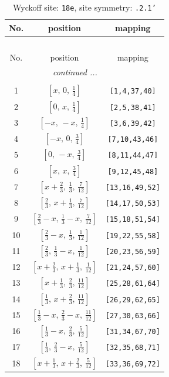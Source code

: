 \documentclass[fleqn,8pt]{jsarticle}
\begin{document}
\renewcommand{\arraystretch}{1.2}
\begin{longtable}{ccc}
\caption{Wyckoff site: {\tt 18e}, site symmetry: {\tt .2.1'}}
 \\
 \hline \hline
No. & position & mapping \\ \hline \endfirsthead

\multicolumn{2}{l}{\tablename\ \thetable{}} \\
 \hline \hline
No. & position & mapping \\ \hline \endhead

 \hline \hline
\multicolumn{2}{r}{\footnotesize\it continued ...} \\ \endfoot

 \hline \hline
\multicolumn{2}{r}{} \\ \endlastfoot

1 & $\left[ x,\, 0,\, \frac{1}{4} \right]$ & {\tt [1,4,37,40]} \\ \hline
2 & $\left[ 0,\, x,\, \frac{1}{4} \right]$ & {\tt [2,5,38,41]} \\ \hline
3 & $\left[ - x,\, - x,\, \frac{1}{4} \right]$ & {\tt [3,6,39,42]} \\ \hline
4 & $\left[ - x,\, 0,\, \frac{3}{4} \right]$ & {\tt [7,10,43,46]} \\ \hline
5 & $\left[ 0,\, - x,\, \frac{3}{4} \right]$ & {\tt [8,11,44,47]} \\ \hline
6 & $\left[ x,\, x,\, \frac{3}{4} \right]$ & {\tt [9,12,45,48]} \\ \hline
7 & $\left[ x + \frac{2}{3},\, \frac{1}{3},\, \frac{7}{12} \right]$ & {\tt [13,16,49,52]} \\ \hline
8 & $\left[ \frac{2}{3},\, x + \frac{1}{3},\, \frac{7}{12} \right]$ & {\tt [14,17,50,53]} \\ \hline
9 & $\left[ \frac{2}{3} - x,\, \frac{1}{3} - x,\, \frac{7}{12} \right]$ & {\tt [15,18,51,54]} \\ \hline
10 & $\left[ \frac{2}{3} - x,\, \frac{1}{3},\, \frac{1}{12} \right]$ & {\tt [19,22,55,58]} \\ \hline
11 & $\left[ \frac{2}{3},\, \frac{1}{3} - x,\, \frac{1}{12} \right]$ & {\tt [20,23,56,59]} \\ \hline
12 & $\left[ x + \frac{2}{3},\, x + \frac{1}{3},\, \frac{1}{12} \right]$ & {\tt [21,24,57,60]} \\ \hline
13 & $\left[ x + \frac{1}{3},\, \frac{2}{3},\, \frac{11}{12} \right]$ & {\tt [25,28,61,64]} \\ \hline
14 & $\left[ \frac{1}{3},\, x + \frac{2}{3},\, \frac{11}{12} \right]$ & {\tt [26,29,62,65]} \\ \hline
15 & $\left[ \frac{1}{3} - x,\, \frac{2}{3} - x,\, \frac{11}{12} \right]$ & {\tt [27,30,63,66]} \\ \hline
16 & $\left[ \frac{1}{3} - x,\, \frac{2}{3},\, \frac{5}{12} \right]$ & {\tt [31,34,67,70]} \\ \hline
17 & $\left[ \frac{1}{3},\, \frac{2}{3} - x,\, \frac{5}{12} \right]$ & {\tt [32,35,68,71]} \\ \hline
18 & $\left[ x + \frac{1}{3},\, x + \frac{2}{3},\, \frac{5}{12} \right]$ & {\tt [33,36,69,72]} \\
\end{longtable}
\end{document}
